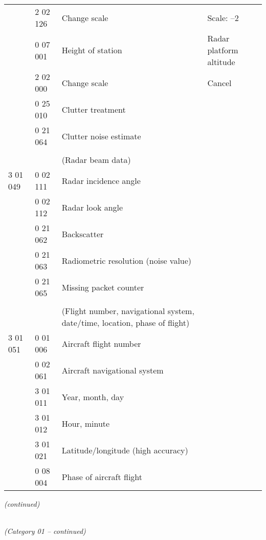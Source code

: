 \begin{longtable}[]{@{}llll@{}}
& 2 02 126 & Change scale & Scale: --2\tabularnewline
& 0 07 001 & Height of station & Radar platform altitude\tabularnewline
& 2 02 000 & Change scale & Cancel\tabularnewline
& 0 25 010 & Clutter treatment &\tabularnewline
& 0 21 064 & Clutter noise estimate &\tabularnewline
& & &\tabularnewline
& & (Radar beam data) &\tabularnewline
3 01 049 & 0 02 111 & Radar incidence angle &\tabularnewline
& 0 02 112 & Radar look angle &\tabularnewline
& 0 21 062 & Backscatter &\tabularnewline
& 0 21 063 & Radiometric resolution (noise value) &\tabularnewline
& 0 21 065 & Missing packet counter &\tabularnewline
& & &\tabularnewline
& & (Flight number, navigational system, date/time, location, phase of flight) &\tabularnewline
3 01 051 & 0 01 006 & Aircraft flight number &\tabularnewline
& 0 02 061 & Aircraft navigational system &\tabularnewline
& 3 01 011 & Year, month, day &\tabularnewline
& 3 01 012 & Hour, minute &\tabularnewline
& 3 01 021 & Latitude/longitude (high accuracy) &\tabularnewline
& 0 08 004 & Phase of aircraft flight &\tabularnewline
\bottomrule
\end{longtable}

\emph{(continued)}

\emph{\\
(Category 01 -- continued)}


